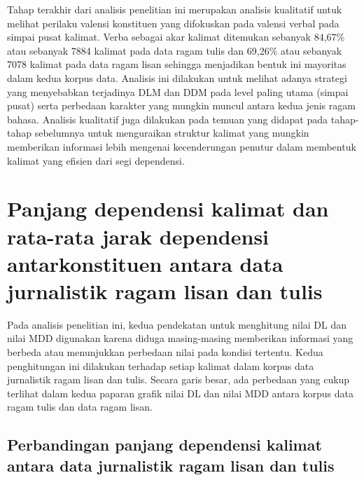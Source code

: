 Tahap terakhir dari analisis penelitian ini merupakan analisis kualitatif untuk melihat perilaku valensi konstituen yang difokuskan pada valensi verbal pada simpai pusat kalimat. Verba sebagai akar kalimat ditemukan sebanyak 84,67\% atau sebanyak 7884 kalimat pada data ragam tulis dan 69,26\% atau sebanyak 7078 kalimat pada data ragam lisan sehingga menjadikan bentuk ini mayoritas dalam kedua korpus data. Analisis ini dilakukan untuk melihat adanya strategi yang menyebabkan terjadinya DLM dan DDM pada level paling utama (simpai pusat) serta perbedaan karakter yang mungkin muncul antara kedua jenis ragam bahasa. Analisis kualitatif juga dilakukan pada temuan yang didapat pada tahap-tahap sebelumnya untuk menguraikan struktur kalimat yang mungkin memberikan informasi lebih mengenai kecenderungan penutur dalam membentuk kalimat yang efisien dari segi dependensi.

\section{Panjang dependensi kalimat dan rata-rata jarak dependensi antarkonstituen antara data jurnalistik ragam lisan dan tulis}
Pada analisis penelitian ini, kedua pendekatan untuk menghitung nilai DL dan nilai MDD digunakan karena diduga masing-masing memberikan informasi yang berbeda atau menunjukkan perbedaan nilai pada kondisi tertentu. Kedua penghitungan ini dilakukan terhadap setiap kalimat dalam korpus data jurnalistik ragam lisan dan tulis. Secara garis besar, ada perbedaan yang cukup terlihat dalam kedua paparan grafik nilai DL dan nilai MDD antara korpus data ragam tulis dan data ragam lisan.

\subsection{Perbandingan panjang dependensi kalimat antara data jurnalistik ragam lisan dan tulis}

